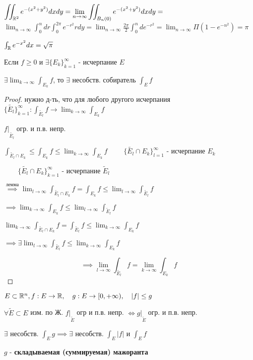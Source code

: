     \begin{illustration}
        $\displaystyle \iint_{\mathbb{R}^2} e^{-(x^2+y^2)} dxdy= \lim_{n\to\infty} \iint_{B_n(0)} e^{-(x^2+y^2)}dxdy = $
        $\displaystyle
        \lim_{n\to\infty} \int^n_0 dr \int^{2\pi}_0 e^{-r^2}rdy = 
        \lim_{n\to\infty} \frac{2\pi}{2} \int^n_0 de^{-r^2} = \lim_{n\to\infty}\Pi(1-e^{-n^2}) = \pi$

        $\int_{\mathbb{R}} e^{-x^2}dx = \sqrt{\pi}$
    \end{illustration}

    \begin{lemma}
        Если $f \ge 0$ и $\exists \{ E_k\}^\infty_{k=1}$ - исчерпание $E$

        $\displaystyle\exists \lim_{k\to\infty} \int_{E_k}f$, то $\exists$ несобств. собиратель $\int_E f$

    \end{lemma}
    \begin{proof}
        нужно д-ть, что для любого другого исчерпания 
        $\{\widetilde{E_l}\}^\infty_{k=1}: \int_{\widetilde{E_l}}f \to \lim_{k\to\infty}\int_{E_k}f$
        
        $f|\underset{\widetilde{E_l}}{ }$ огр. и п.в. непр.

        $\int_{\widetilde{E_l}\cap E_k} \le \int_{E_k}f \le \lim_{k\to\infty} \int_{E_k} f$
        $\qquad \{\widetilde{E_l}\cap E_k\}^\infty_{l=1}$ - исчерпание $E_k$

        $\qquad \{\widetilde{E_l}\cap E_k\}^\infty_{k=1}$ - исчерпание $\widetilde E_l$

        $\overset{\text{лемма}}{\implies} \lim_{l \to \infty} \int_{\widetilde{E_l} \cap E_k}f = \int_{E_k} f \le \lim_{l\to\infty} \int_{\widetilde{E_l}} f$ %
        
        $\implies \lim_{k\to\infty} \int_{E_k} f \le \lim_{l\to\infty} \int_{\widetilde E_l} f$

        $\lim_{k\to\infty} \int_{\widetilde{E_l}\cap E_k} f= \int_{\widetilde{E_l}} f \le \lim_{k\to\infty} \int_{E_k}f$

        $\implies \exists \lim_{l\to\infty}\int_{\widetilde{E_l}} f \le \lim_{k\to\infty}\int_{E_k} f$

        $$\implies \lim_{l\to\infty} \int_{\widetilde{E_l}} f = \lim_{k\to\infty} \int_{E_k} f$$
    \end{proof}

    \begin{lemma}
        $E \subset \mathbb{R}^n, f: E \to \mathbb{R},\quad g: E \to [0, + \infty),\quad |f| \le g$

        $\forall \widetilde{E} \subset E$ изм. по Ж. $f| \underset{\widetilde{E}}{ }$ огр и п.в. непр.
        $\iff g|\underset{\widetilde{E}}{ }$ огр. и п.в. непр.

        $\exists $ несобств. $\int_E g \implies \exists $ несобств. $\int_E |f|$ и $\int_E f$

        $g$ - \textbf{складываемая (суммируемая) мажоранта} %
    \end{lemma}

